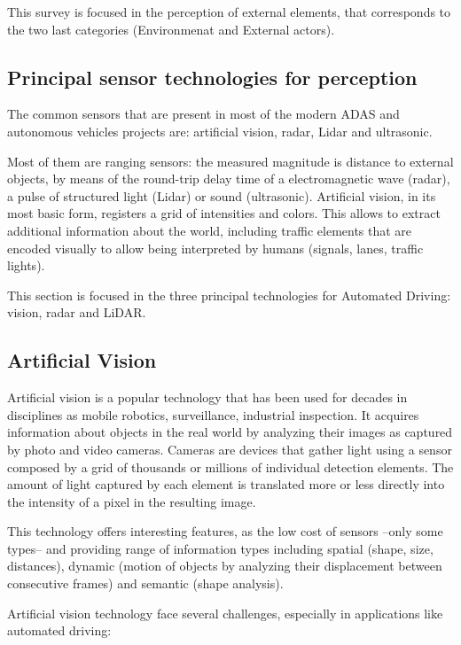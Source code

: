 This survey is focused in the perception of external elements, that corresponds 
to the two last categories (Environmenat and External actors).

\subsection{Principal sensor technologies for perception}

The common sensors that are present in most of the modern ADAS and autonomous vehicles projects are: artificial vision, radar, Lidar and ultrasonic.

Most of them are ranging sensors: the measured magnitude is distance to 
external objects, by means of the round-trip delay time of a electromagnetic 
wave (radar), a pulse of structured light (Lidar) or sound (ultrasonic).
Artificial vision, in its most basic form, registers a grid of intensities and 
colors. This allows to extract additional information about the world, including 
traffic elements that are encoded visually to allow being interpreted by humans 
(signals, lanes, traffic lights).

This section is focused in the three principal technologies for Automated 
Driving: vision, radar and LiDAR.


\subsection{Artificial Vision}
Artificial vision is a popular technology that has been used for decades in 
disciplines as mobile robotics, surveillance, industrial inspection. It acquires
information about objects in the real world by analyzing their images as 
captured by photo and video cameras. Cameras are devices that gather light using
a sensor composed by a grid of thousands or millions of individual detection 
elements. The amount of light captured by each element is translated more or 
less directly into the intensity of a pixel in the resulting image. 

This technology offers interesting features, as the low cost of sensors --only 
some types-- and providing range of information types including spatial
(shape, size, distances), dynamic (motion of objects by analyzing their 
displacement between consecutive frames) and semantic (shape analysis).

Artificial vision technology face several challenges, especially in 
applications like automated driving:

